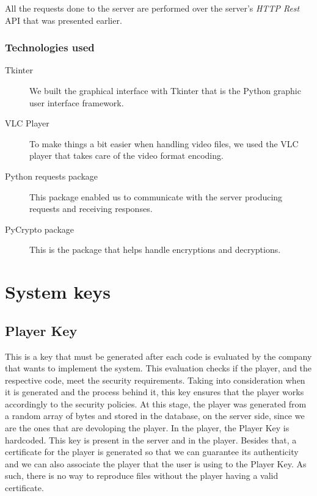 \documentclass[11pt,a4paper]{report}
\begin{document}
All the requests done to the server are performed over the server's \emph{HTTP Rest} API that was presented earlier.

\subsection{Technologies used}
\begin{description}
  \item[Tkinter] We built the graphical interface with Tkinter that is the Python graphic user interface framework.
  \item[VLC Player] To make things a bit easier when handling video files, we used the VLC player that takes care of the video format encoding.
  \item[Python requests package] This package enabled us to communicate with the server producing requests and receiving responses.
  \item[PyCrypto package] This is the package that helps handle encryptions and decryptions.
\end{description}

\chapter{System keys}
\section{Player Key}
This is a key that must be generated after each code is evaluated by the company that wants to implement the system. 
This evaluation checks if the player, and the respective code, meet the security requirements. 
Taking into consideration when it is generated and the process behind it, this key ensures that the player works accordingly to the security policies.
\newline At this stage, the player was generated from a random array of bytes and stored in the database, on the server side, since we are the ones that are devoloping the player.
In the player, the Player Key is hardcoded.
\newline This key is present in the server and in the player.
Besides that, a certificate for the player is generated so that we can guarantee its authenticity and we can also associate the player that the user is using to the Player Key. As such, there is no way to reproduce files without the player having a valid certificate.
\end{document}
